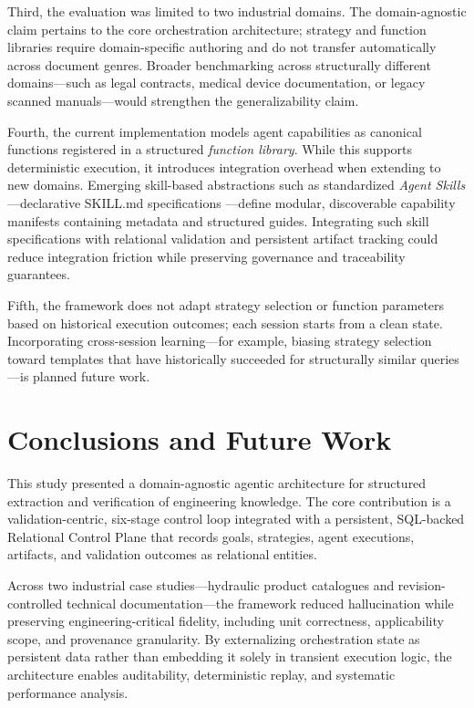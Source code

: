\documentclass[largeformat]{interact}
\begin{document}
Third, the evaluation was limited to two industrial domains. The domain-agnostic claim pertains to the core orchestration architecture; strategy and function libraries require domain-specific authoring and do not transfer automatically across document genres. Broader benchmarking across structurally different domains—such as legal contracts, medical device documentation, or legacy scanned manuals—would strengthen the generalizability claim.

Fourth, the current implementation models agent capabilities as canonical functions registered in a structured \emph{function library}. While this supports deterministic execution, it introduces integration overhead when extending to new domains. Emerging skill-based abstractions such as standardized \textit{Agent Skills}—declarative SKILL.md specifications \cite{agentskills2024}—define modular, discoverable capability manifests containing metadata and structured guides. Integrating such skill specifications with relational validation and persistent artifact tracking could reduce integration friction while preserving governance and traceability guarantees.

Fifth, the framework does not adapt strategy selection or function parameters based on historical execution outcomes; each session starts from a clean state. Incorporating cross-session learning---for example, biasing strategy selection toward templates that have historically succeeded for structurally similar queries---is planned future work.


\section{Conclusions and Future Work}
\label{sec:conclusions_and_future_work}
This study presented a domain-agnostic agentic architecture for structured extraction and verification of engineering knowledge. The core contribution is a validation-centric, six-stage control loop integrated with a persistent, SQL-backed Relational Control Plane that records goals, strategies, agent executions, artifacts, and validation outcomes as relational entities.

Across two industrial case studies—hydraulic product catalogues and revision-controlled technical documentation—the framework reduced hallucination while preserving engineering-critical fidelity, including unit correctness, applicability scope, and provenance granularity. By externalizing orchestration state as persistent data rather than embedding it solely in transient execution logic, the architecture enables auditability, deterministic replay, and systematic performance analysis.
\end{document}
